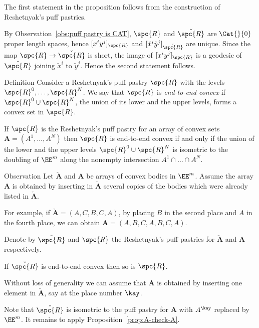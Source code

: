 The first statement in the proposition 
follows from the construction of Reshetnyak's  puff pastries.

By Observation~\ref{obs:puff pastry is CAT}, 
$\spc{R}$  and  $\check{\spc{R}}$ are $\Cat{}{0}$ proper length spaces, 
hence $[x^i y^j]_{\spc{R}}$ 
and $[\check x^i \check y^j]_{\check{\spc{R}}}$ are unique.  
Since the map $\spc{R}\to\check{\spc{R}}$ is short, the image of $[x^i y^j]_{\spc{R}}$
is a geodesic of $\check{\spc{R}}$ joining $\check x^i$ to $\check y^j$.
Hence the second statement follows.
\qeds

\begin{thm}{Definition}
Consider a Reshetnyak's puff pastry $\spc{R}$ with the levels 
$\spc{R}^0,\dots,\spc{R}^N$.
We say that $\spc{R}$ is \emph{end-to-end convex} 
if $\spc{R}^0\cup\spc{R}^N$, the union of its lower and the upper levels, 
forms a convex set in $\spc{R}$. %
\end{thm}

If $\spc{R}$ is the Reshetnyak's puff pastry for an array of convex sets $\bm{A}=(A^{1},\dots, A^{N})$
then $\spc{R}$ is end-to-end convex
if and only if the union of the lower and the upper levels
$\spc{R}^0\cup\spc{R}^N$ is isometric to the doubling of $\EE^m$ along the nonempty intersection $A^1\cap\dots\cap A^N$.


\begin{thm}{Observation}\label{obs:end-to-end-convex}
Let $\check{\bm{A}}$ and $\bm{A}$ be arrays of convex bodies in $\EE^m$.
Assume 
the  array $\bm{A}$ is
obtained by inserting in $\check{\bm{A}}$ 
several copies of the bodies which were already listed in $\check{\bm{A}}$.

For example, if $\check{\bm{A}}=(A,C,B,C,A)$, by placing $B$ in the second place and $A$ in the fourth place, we can obtain $\bm{A}=(A,B,C,A,B,C,A)$.

Denote by $\check{\spc{R}}$ and $\spc{R}$ 
the Reshetnyak's puff pastries for $\check{\bm{A}}$ and $\bm{A}$ respectively.

If $\check{\spc{R}}$ is end-to-end convex then so is $\spc{R}$.
\end{thm}

Without loss of generality we can assume that $\bm{A}$ is 
obtained by inserting one element in $\check{\bm{A}}$,
say at the place number $\kay$.

Note that $\check{\spc{R}}$ is isometric to the puff pastry 
for $\bm{A}$ with $A^\kay$ replaced by $\EE^m$.
It remains to apply Proposition~\ref{prop:A-check-A}.
\qeds


